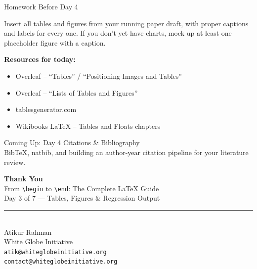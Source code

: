 \documentclass[11pt,aspectratio=169]{beamer}
\begin{document}
\begin{frame}{Homework Before Day 4}
  \begin{homeworkbox}
    Insert all tables and figures from your running paper draft, with
    proper captions and labels for every one. If you don't yet have
    charts, mock up at least one placeholder figure with a caption.
  \end{homeworkbox}
  \vspace{10pt}
  \small\textbf{Resources for today:}
  \begin{itemize}\small
    \item Overleaf -- ``Tables'' / ``Positioning Images and Tables''
    \item Overleaf -- ``Lists of Tables and Figures''
    \item tablesgenerator.com
    \item Wikibooks LaTeX -- Tables and Floats chapters
  \end{itemize}
\end{frame}

\begin{frame}{Coming Up: Day 4}
  \Large
  \centering
  Citations \& Bibliography \\[6pt]
  \normalsize
  BibTeX, natbib, and building an author-year citation pipeline for
  your literature review.
\end{frame}

\begin{frame}[plain]
  \begin{center}
    \vspace{35pt}
    {\Large\bfseries Thank You}\\[10pt]
    {\large From \texttt{\textbackslash begin} to \texttt{\textbackslash end}: The Complete LaTeX Guide}\\[4pt]
    Day 3 of 7 --- Tables, Figures \& Regression Output\\[20pt]
    \rule{0.5\textwidth}{0.4pt}\\[10pt]
    Atikur Rahman \\
    White Globe Initiative \\[2pt]
    \texttt{atik@whiteglobeinitiative.org} \\
    \texttt{contact@whiteglobeinitiative.org}
  \end{center}
\end{frame}
\end{document}
